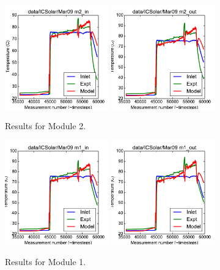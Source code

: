 \documentclass{article}
\begin{document}
\clearpage
\begin{figure}[!ht]
\centering
\includegraphics[width=0.4\textwidth]{../../data/ICSolar/images/Mar09_m2_in_unsteady.pdf}\hspace{0.05\textwidth}
\includegraphics[width=0.4\textwidth]{../../data/ICSolar/images/Mar09_m2_out_unsteady.pdf}\hspace{0.05\textwidth}\\
\caption{Results for Module 2.}\end{figure}
\begin{figure}[!ht]
\centering
\includegraphics[width=0.4\textwidth]{../../data/ICSolar/images/Mar09_m1_in_unsteady.pdf}\hspace{0.05\textwidth}
\includegraphics[width=0.4\textwidth]{../../data/ICSolar/images/Mar09_m1_out_unsteady.pdf}\hspace{0.05\textwidth}\\
\caption{Results for Module 1.}\end{figure}
\end{document}
